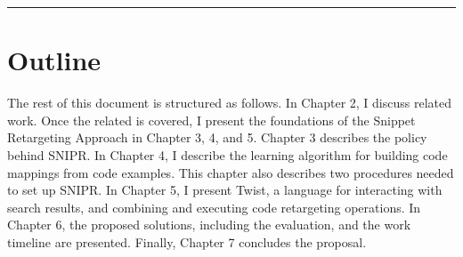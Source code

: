 \fancybreak{\pfbreakdisplay}

\section{Outline}
\label{sec:outline}

The rest of this document is structured as follows. In Chapter 2, I discuss related work.
Once the related is covered, I present the foundations of the Snippet Retargeting Approach in Chapter 3, 4, and 5. Chapter 3 describes the policy behind \uppercase{SnipR}. In Chapter 4, I describe the learning algorithm for building code mappings from code examples. This chapter also describes two procedures needed to set up \uppercase{SnipR}. In Chapter 5, I present Twist, a language for interacting with search results, and combining
and executing code retargeting operations. In Chapter 6, the proposed solutions, including the evaluation, and the work timeline are presented. Finally, Chapter 7 concludes the proposal.